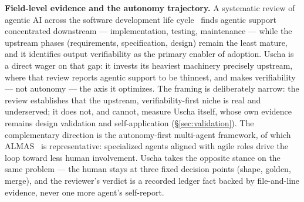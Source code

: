 \documentclass[11pt]{article}
\begin{document}
\textbf{Field-level evidence and the autonomy trajectory.} A systematic review
of agentic AI across the software development life
cycle~\cite{alvanakis2026assistance} finds agentic support concentrated
downstream --- implementation, testing, maintenance --- while the upstream
phases (requirements, specification, design) remain the least mature, and it
identifies output verifiability as the primary enabler of adoption.
Uscha is a direct wager on that gap: it invests its heaviest machinery
precisely upstream, where that review reports agentic support to be thinnest, and
makes verifiability --- not autonomy --- the axis it optimizes. The framing is
deliberately narrow: the review establishes that the upstream,
verifiability-first niche is real and underserved; it does not, and cannot,
measure Uscha itself, whose own evidence remains design validation and
self-application (\S\ref{sec:validation}). The complementary direction is the
autonomy-first multi-agent framework, of which ALMAS~\cite{tawosi2025almas} is
representative: specialized agents aligned with agile roles drive the loop
toward less human involvement. Uscha takes the opposite stance on the same
problem --- the human stays at three fixed decision points (shape, golden,
merge), and the reviewer's verdict is a recorded ledger fact backed by
file-and-line evidence, never one more agent's self-report.
\end{document}
